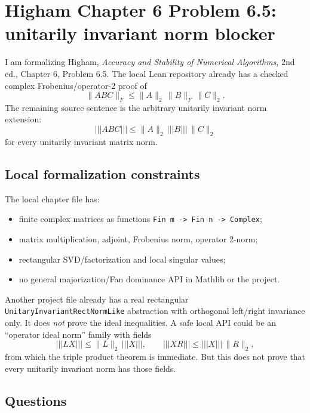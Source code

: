 \documentclass{article}
\begin{document}
\section*{Higham Chapter 6 Problem 6.5: unitarily invariant norm blocker}

I am formalizing Higham, \emph{Accuracy and Stability of Numerical
Algorithms}, 2nd ed., Chapter 6, Problem 6.5.  The local Lean repository already
has a checked complex Frobenius/operator-2 proof of
\[
  \|ABC\|_F \le \|A\|_2\,\|B\|_F\,\|C\|_2 .
\]
The remaining source sentence is the arbitrary unitarily invariant norm
extension:
\[
  |||ABC||| \le \|A\|_2\,|||B|||\,\|C\|_2
\]
for every unitarily invariant matrix norm.

\subsection*{Local formalization constraints}

The local chapter file has:
\begin{itemize}
\item finite complex matrices as functions \texttt{Fin m -> Fin n -> Complex};
\item matrix multiplication, adjoint, Frobenius norm, operator 2-norm;
\item rectangular SVD/factorization and local singular values;
\item no general majorization/Fan dominance API in Mathlib or the project.
\end{itemize}

Another project file already has a real rectangular
\texttt{UnitaryInvariantRectNormLike} abstraction with orthogonal left/right
invariance only.  It does \emph{not} prove the ideal inequalities.  A safe local
API could be an ``operator ideal norm'' family with fields
\[
  |||LX||| \le \|L\|_2\,|||X|||,\qquad
  |||XR||| \le |||X|||\,\|R\|_2,
\]
from which the triple product theorem is immediate.  But this does not prove
that every unitarily invariant norm has those fields.

\subsection*{Questions}
\end{document}
